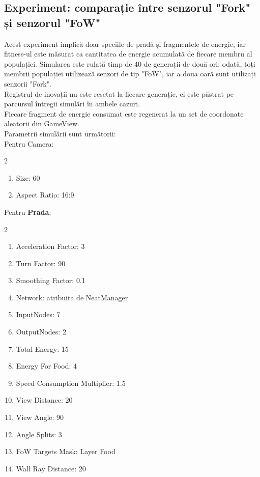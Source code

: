 \subsection{Experiment: comparație între senzorul "Fork" și senzorul "FoW"}\label{ParametersFowVsFork}
Acest experiment implică doar speciile de pradă și fragmentele de energie, iar fitness-ul este măsurat ca cantitatea de energie acumulată de fiecare membru al populației.
Simularea este rulată timp de 40 de generații de două ori: odată, toți membrii populației utilizează senzori de tip "FoW", iar a doua oară sunt utilizați senzorii "Fork".\\
Registrul de inovații nu este resetat la fiecare generație, ci este păstrat pe parcursul întregii simulări în ambele cazuri.\\
Fiecare fragment de energie consumat este regenerat la un set de coordonate aleatorii din GameView.\\
Parametrii simulării sunt următorii:\\
Pentru Camera:
\begin{multicols}{2}
    \begin{enumerate}
        \item Size: 60
        \item Aspect Ratio: 16:9
    \end{enumerate}
\end{multicols}

Pentru \textbf{Prada}:
\begin{multicols}{2}
    \begin{enumerate}
        \item Acceleration Factor: 3
        \item Turn Factor: 90
        \item Smoothing Factor: 0.1
        \item Network: atribuita de NeatManager
        \item InputNodes: 7
        \item OutputNodes: 2
        \item Total Energy: 15
        \item Energy For Food: 4
        \item Speed Consumption Multiplier: 1.5
        \item View Distance: 20
        \item View Angle: 90
        \item Angle Splits: 3
        \item FoW Targets Mask: Layer Food
        \item Wall Ray Distance: 20
    \end{enumerate}
\end{multicols}

